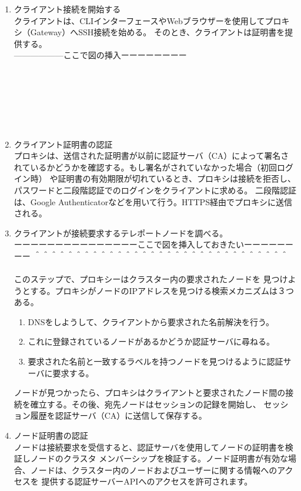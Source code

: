 \documentclass[12pt,a4paper,titlepage]{jsarticle}
\begin{document}
\begin{enumerate}[1:]

    \item クライアント接続を開始する\mbox{}\\クライアントは、CLIインターフェースやWebブラウザーを使用してプロキシ（Gateway）へSSH接続を始める。
    そのとき、クライアントは証明書を提供する。\\
    ------------------ここで図の挿入ーーーーーーーー\\\\\\\\\\\\\\

    \item クライアント証明書の認証\mbox{}\\
    プロキシは、送信された証明書が以前に認証サーバ（CA）によって署名されているかどうかを確認する。もし署名がされていなかった場合（初回ログイン時）
    や証明書の有効期限が切れているとき、プロキシは接続を拒否し、パスワードと二段階認証でのログインをクライアントに求める。
    二段階認証は、Google Authenticatorなどを用いて行う。HTTPS経由でプロキシに送信される。
    
    \item クライアントが接続要求するテレポートノードを調べる。\mbox{}\\
    ーーーーーーーーーーーーーーーここで図を挿入しておきたいーーーーーーーー
    ＾＾＾＾＾＾＾＾＾＾＾＾＾＾＾＾＾＾＾＾＾＾＾＾＾＾＾＾＾＾＾\\\\


    このステップで、プロキシーはクラスター内の要求されたノードを
    見つけようとする。プロキシがノードのIPアドレスを見つける検索メカニズムは３つある。
    \begin{enumerate}[(1)]
        \item DNSをしようして、クライアントから要求された名前解決を行う。
        \item これに登録されているノードがあるかどうか認証サーバに尋ねる。
        \item 要求された名前と一致するラベルを持つノードを見つけるように認証サーバに要求する。
    \end{enumerate}
    ノードが見つかったら、プロキシはクライアントと要求されたノード間の接続を確立する。その後、宛先ノードはセッションの記録を開始し、
    セッション履歴を認証サーバ（CA）に送信して保存する。
    \item ノード証明書の認証\mbox{}\\ノードは接続要求を受信すると、認証サーバを使用してノードの証明書を検証しノードのクラスタ
    メンバーシップを検証する。ノード証明書が有効な場合、ノードは、クラスター内のノードおよびユーザーに関する情報へのアクセスを
    提供する認証サーバーAPIへのアクセスを許可されます。


\end{enumerate}
\end{document}
